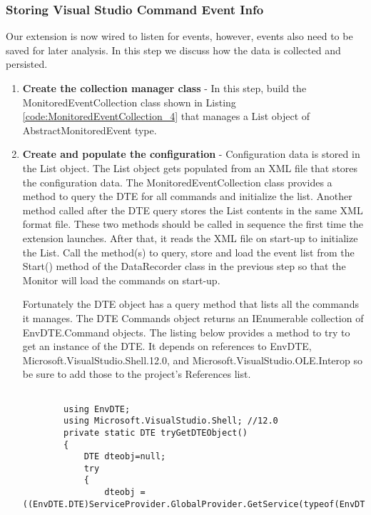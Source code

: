 \subsubsection{Storing Visual Studio Command Event Info}

Our extension is now wired to listen for events, however, events also need to be saved for later analysis. In this step we discuss how the data is collected and persisted.

\begin{enumerate}
\item {\bf Create the collection manager class} -
In this step, build the MonitoredEventCollection class shown in Listing \ref{code:MonitoredEventCollection_4} that manages a List object of AbstractMonitoredEvent type.  

\item {\bf Create and populate the configuration} -
Configuration data is stored in the List object.
The List object gets populated from an XML file that stores the configuration data.  The MonitoredEventCollection class provides a method to query the DTE for all commands and initialize the list.  
Another method called after the DTE query stores the List contents in the same XML format file.  These two methods should be called in sequence the first time the extension launches. After that, it  reads the XML file on start-up to initialize the List.  Call the method(s) to query, store and load the event list from the Start() method of the DataRecorder class in the previous step so that the Monitor will load the commands on start-up.

Fortunately the DTE object has a query method that lists all the commands it manages.   The DTE Commands object returns an IEnumerable collection of EnvDTE.Command objects. The listing below provides a method to try to get an instance of the DTE.  It depends on references to EnvDTE, Microsoft.VisualStudio.Shell.12.0, and Microsoft.VisualStudio.OLE.Interop so be sure to add those to the project's References list.

\begin{lstlisting}

		using EnvDTE;
		using Microsoft.VisualStudio.Shell; //12.0
		private static DTE tryGetDTEObject()
		{
			DTE dteobj=null;
			try
			{
				dteobj = ((EnvDTE.DTE)ServiceProvider.GlobalProvider.GetService(typeof(EnvDTE.DTE).GUID)).DTE;


\end{lstlisting}
\end{enumerate}

